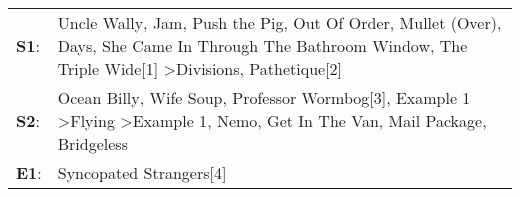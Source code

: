 \begin{supertabular}{p{0.03\textwidth}p{0.92\textwidth}}
 \textbf{S1}:  &  Uncle Wally\textsuperscript{}, \enspace Jam\textsuperscript{}, \enspace Push the Pig\textsuperscript{}, \enspace Out Of Order\textsuperscript{}, \enspace Mullet (Over)\textsuperscript{},  Days\textsuperscript{}, \enspace She Came In Through The Bathroom Window\textsuperscript{}, \enspace The Triple Wide[1]\textsuperscript{} \textgreater \enspace Divisions\textsuperscript{}, \enspace Pathetique[2]\textsuperscript{}  \enspace  \\
 \textbf{S2}:  &                       Ocean Billy\textsuperscript{}, \enspace Wife Soup\textsuperscript{}, \enspace Professor Wormbog[3]\textsuperscript{}, \enspace Example 1\textsuperscript{} \textgreater \enspace Flying\textsuperscript{} \textgreater \enspace Example 1\textsuperscript{}, \enspace Nemo\textsuperscript{}, \enspace Get In The Van\textsuperscript{}, \enspace Mail Package\textsuperscript{}, \enspace Bridgeless\textsuperscript{}  \enspace  \\
 \textbf{E1}:  &                                                                                                                                                                                                                                                                                                                                                                                                     Syncopated Strangers[4]\textsuperscript{}  \enspace  \\
\end{supertabular}
